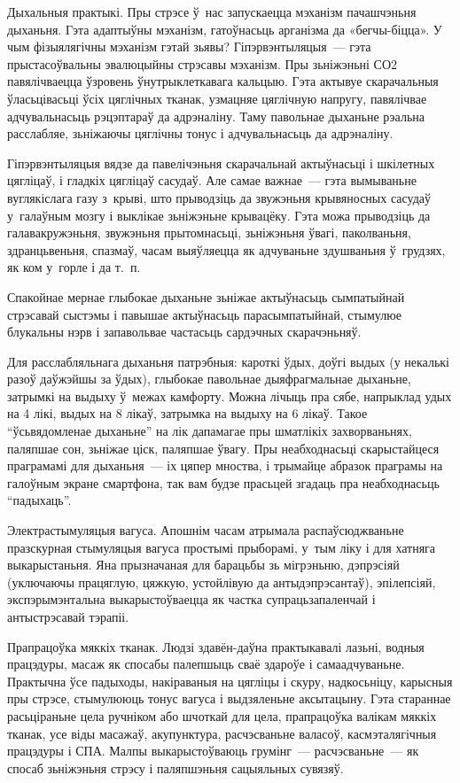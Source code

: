 Дыхальныя практыкі. Пры стрэсе ў~нас запускаецца мэханізм пачашчэньня дыханьня. Гэта адаптыўны мэханізм, гатоўнасьць арганізма да «бегчы-біцца». У чым фізыялягічны мэханізм гэтай зьявы? Гіпэрвэнтыляцыя~--- гэта прыстасоўвальны эвалюцыйны стрэсавы мэханізм. Пры зьніжэньні СО2 павялічваецца ўзровень ўнутрыклеткавага кальцыю. Гэта актывуе скарачальныя ўласьцівасьці ўсіх цяглічных тканак, узмацняе цяглічную напругу, павялічвае адчувальнасьць рэцэптараў да адрэналіну. Таму павольнае дыханьне рэальна расслабляе, зьніжаючы цяглічны тонус і адчувальнасьць да адрэналіну.

Гіпэрвэнтыляцыя вядзе да павелічэньня скарачальнай актыўнасьці і шкілетных цягліцаў, і гладкіх цягліцаў сасудаў. Але самае важнае~--- гэта вымываньне вуглякіслага газу з~крыві, што прыводзіць да звужэньня крывяносных сасудаў у~галаўным мозгу і выклікае зьніжэньне крывацёку. Гэта можа прыводзіць да галавакружэньня, звужэньня прытомнасьці, зьніжэньня ўвагі, паколваньня, здранцьвеньня, спазмаў, часам выяўляецца як адчуваньне здушваньня ў~грудзях, як ком у~горле і да т.~п. 

Спакойнае мернае глыбокае дыханьне зьніжае актыўнасьць сымпатыйнай стрэсавай сыстэмы і павышае актыўнасьць парасымпатыйнай, стымулюе блукальны нэрв і запавольвае частасьць сардэчных скарачэньняў.

Для расслабляльнага дыханьня патрэбныя: кароткі ўдых, доўгі выдых (у некалькі разоў даўжэйшы за ўдых), глыбокае павольнае дыяфрагмальнае дыханьне, затрымкі на выдыху ў~межах камфорту. Можна лічыць пра сябе, напрыклад удых на 4 лікі, выдых на 8 лікаў, затрымка на выдыху на 6 лікаў. Такое ``ўсьвядомленае дыханьне'' на лік дапамагае пры шматлікіх захворваньнях, паляпшае сон, зьніжае ціск, паляпшае ўвагу. Пры неабходнасьці скарыстайцеся праграмамі для дыханьня~--- іх цяпер мноства, і трымайце абразок праграмы на галоўным экране смартфона, так вам будзе прасьцей згадаць пра неабходнасьць ``падыхаць''.

Электрастымуляцыя вагуса. Апошнім часам атрымала распаўсюджваньне празскурная стымуляцыя вагуса простымі прыборамі, у~тым ліку і для хатняга выкарыстаньня. Яна прызначаная для барацьбы зь мігрэньню, дэпрэсіяй (уключаючы працяглую, цяжкую, устойлівую да антыдэпрэсантаў), эпілепсіяй, экспэрымэнтальна выкарыстоўваецца як частка супрацьзапаленчай і антыстрэсавай тэрапіі.

Прапрацоўка мяккіх тканак. Людзі здавён-даўна практыкавалі лазьні, водныя працэдуры, масаж як спосабы палепшыць сваё здароўе і самаадчуваньне. Практычна ўсе падыходы, накіраваныя на цягліцы і скуру, надкосьніцу, карысныя пры стрэсе, стымулююць тонус вагуса і выдзяленьне аксытацыну. Гэта стараннае расьціраньне цела ручніком або шчоткай для цела, прапрацоўка валікам мяккіх тканак, усе віды масажаў, акупунктура, расчэсваньне валасоў, касмэталягічныя працэдуры і СПА. Малпы выкарыстоўваюць грумінг~--- расчэсваньне~--- як спосаб зьніжэньня стрэсу і паляпшэньня сацыяльных сувязяў.

